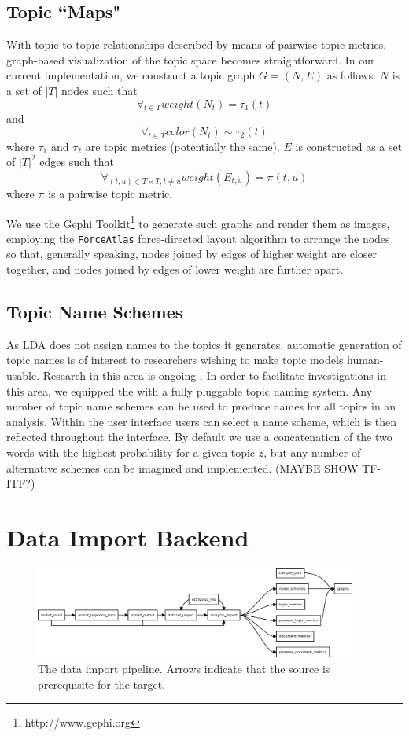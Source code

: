 \documentclass[11pt]{article}
\begin{document}
\subsection{Topic ``Maps"}
With topic-to-topic relationships described by means of pairwise topic metrics,
graph-based visualization of the topic space becomes straightforward. In our
current implementation, we construct a topic graph $G = (N, E)$ as follows:
$N$ is a set of $|T|$ nodes such that
\[\forall_{t\in T} weight(N_{t}) = \tau_{1}(t)\]
and
\[\forall_{t\in T} color(N_{t}) \sim \tau_{2}(t)\]
where $\tau_1$ and $\tau_2$ are topic metrics (potentially the same). $E$ is
constructed as a set of $|T|^2$ edges such that
  \[\forall_{(t,u)\in T\times T, t\neq u} weight(E_{t,u}) = \pi(t,u)\]
where $\pi$ is a pairwise topic metric.

We use the Gephi Toolkit\footnote{http://www.gephi.org} to generate such graphs
and render them as images, employing the \texttt{ForceAtlas} force-directed
layout algorithm to arrange the nodes so that, generally speaking, nodes joined
by edges of higher weight are closer together, and nodes joined by edges of
lower weight are further apart.


\subsection{Topic Name Schemes}
As LDA does not assign names to the topics it generates, automatic generation of
topic names is of interest to researchers wishing to make topic models
human-usable. Research in this area is ongoing \cite{Mei2007,Lau2010}. In order to
facilitate investigations in this area, we equipped the \tool{} with a
fully pluggable topic naming system. Any number of topic name schemes can be
used to produce names for all topics in an analysis. Within the user interface
users can select a name scheme, which is then reflected throughout the
interface. By default we use a concatenation of the two
words with the highest probability for a given topic $z$, but any number of
alternative schemes can be imagined and implemented. (MAYBE SHOW TF-ITF?)

\section{Data Import Backend}
\begin{figure}[t]
 \centering
 \includegraphics[width=400px,keepaspectratio=true]{./build_flowchart.png}
 \caption{The data import pipeline. Arrows indicate that the source is prerequisite for the target.}
 \label{fig:build_flowchart}
\end{figure}
\end{document}
